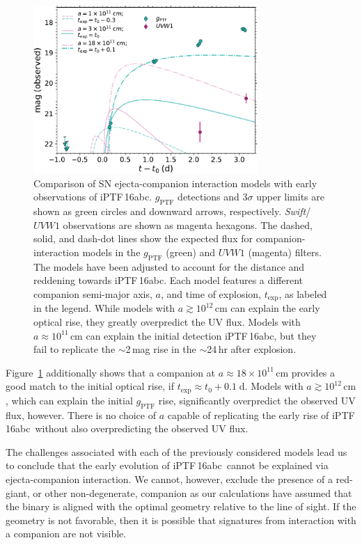 \documentclass[twocolumn]{aastex61}
\newcommand{\abc}{iPTF\,16abc}
\begin{document}
\begin{figure}[!thb]
  \centering
  \includegraphics[width=3.35in]{companion_lc.pdf}
  \caption{Comparison of SN ejecta-companion interaction models 
  with early observations of \abc. $g_\mathrm{PTF}$ 
  detections and 3$\sigma$ upper limits are shown 
  as green circles and downward arrows, respectively. 
  \textit{Swift}/$UVW1$ observations are shown as magenta hexagons.
  The dashed, solid, and dash-dot lines show the expected flux 
  for companion-interaction models in the $g_\mathrm{PTF}$ (green) 
  and $UVW1$ (magenta) filters. The models have been adjusted to 
  account for the distance and reddening towards \abc. Each 
  model features a different companion semi-major axis, $a$, and 
  time of explosion, $t_\mathrm{exp}$, as labeled in the 
  legend. While models with $a \gtrsim 10^{12} \, \mathrm{cm}$ can 
  explain the early optical rise, they greatly 
  overpredict the UV flux. Models with $a \approx 10^{11} \, 
  \mathrm{cm}$ can explain the initial detection \abc, but they 
  fail to replicate the $\sim$2\,mag rise in the $\sim$24\,hr 
  after explosion.
  }
  \label{fig:SN-companion}
\end{figure}

Figure~\ref{fig:SN-companion} additionally shows that a companion at $a
\approx 18 \times 10^{11} \, \mathrm{cm}$ provides a good match to the initial
optical rise, if $t_\mathrm{exp} \approx t_0 + 0.1 \; \mathrm{d}$. Models with
$a \gtrsim 10^{12} \, \mathrm{cm}$, which can explain the initial
$g_\mathrm{PTF}$ rise, significantly overpredict the observed UV flux,
however. There is no choice of $a$ capable of replicating the early rise of
\abc\ without also overpredicting the observed UV flux.

The challenges associated with each of the previously considered models lead
us to conclude that the early evolution of \abc\ cannot be explained via
ejecta-companion interaction. We cannot, however, exclude the presence of a
red-giant, or other non-degenerate, companion as our calculations have assumed
that the binary is aligned with the optimal geometry relative to the line of
sight. If the geometry is not favorable, then it is possible that signatures
from interaction with a companion are not visible.
\end{document}
